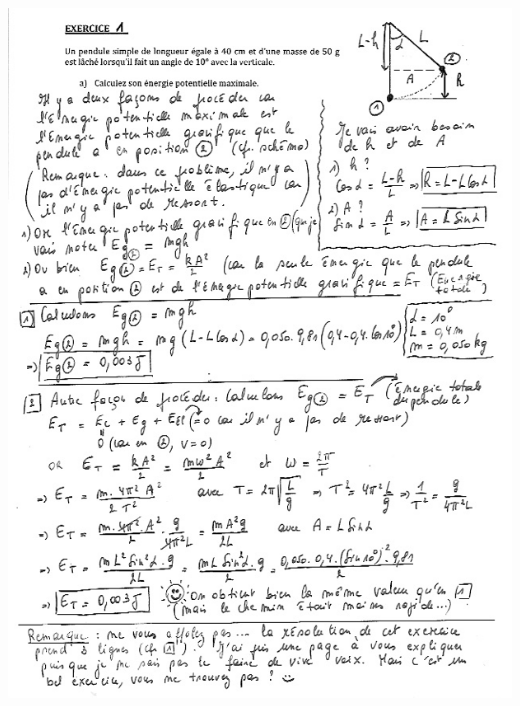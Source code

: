 \includegraphics[width=17.498cm,height=26.033cm]{Pictures/1000000100000264000003450BBDC1031D5BD847.png}

